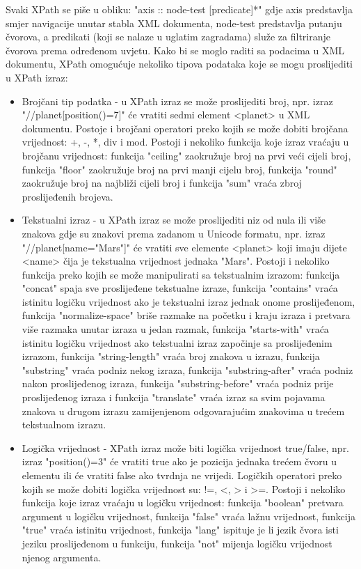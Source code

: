 \documentclass{foi}
\begin{document}
Svaki XPath se piše u obliku: "axis :: node-test [predicate]*" gdje axis predstavlja smjer navigacije unutar stabla XML dokumenta, node-test predstavlja putanju čvorova, a predikati (koji se nalaze u uglatim zagradama) služe za filtriranje čvorova prema određenom uvjetu. Kako bi se moglo raditi sa podacima u XML dokumentu, XPath omogućuje nekoliko tipova podataka koje se mogu proslijediti u XPath izraz:
\begin{itemize}
\item Brojčani tip podatka - u XPath izraz se može proslijediti broj, npr. izraz "//planet[position()=7]" će vratiti sedmi element <planet> u XML dokumentu. Postoje i brojčani operatori preko kojih se može dobiti brojčana vrijednost: +, -, *, div i mod. Postoji i nekoliko funkcija koje izraz vraćaju u brojčanu vrijednost: funkcija "ceiling" zaokružuje broj na prvi veći cijeli broj, funkcija "floor" zaokružuje broj na prvi manji cijelu broj, funkcija "round" zaokružuje broj na najbliži cijeli broj i funkcija "sum" vraća zbroj proslijeđenih brojeva.
\item Tekstualni izraz - u XPath izraz se može proslijediti niz od nula ili više znakova gdje su znakovi prema zadanom u Unicode formatu, npr. izraz "//planet[name="Mars"]" će vratiti sve elemente <planet> koji imaju dijete <name> čija je tekstualna vrijednost jednaka "Mars". Postoji i nekoliko funkcija preko kojih se može manipulirati sa tekstualnim izrazom: funkcija "concat" spaja sve proslijeđene tekstualne izraze, funkcija "contains" vraća istinitu logičku vrijednost ako je tekstualni izraz jednak onome proslijeđenom, funkcija "normalize-space" briše razmake na početku i kraju izraza i pretvara više razmaka unutar izraza u jedan razmak, funkcija "starts-with" vraća istinitu logičku vrijednost ako tekstualni izraz započinje sa proslijeđenim izrazom, funkcija "string-length" vraća broj znakova u izrazu, funkcija "substring" vraća podniz nekog izraza, funkcija "substring-after" vraća podniz nakon proslijeđenog izraza, funkcija "substring-before" vraća podniz prije proslijeđenog izraza i funkcija "translate" vraća izraz sa svim pojavama znakova u drugom izrazu zamijenjenom odgovarajućim znakovima u trećem tekstualnom izrazu.
\item Logička vrijednost - XPath izraz može biti logička vrijednost true/false, npr. izraz "position()=3" će vratiti true ako je pozicija jednaka trećem čvoru u elementu ili će vratiti false ako tvrdnja ne vrijedi.  Logičkih operatori preko kojih se može dobiti logička vrijednost su: !=, <, > i >=. Postoji i nekoliko funkcija koje izraz vraćaju u logičku vrijednost: funkcija "boolean" pretvara argument u logičku vrijednost, funkcija "false" vraća lažnu vrijednost, funkcija "true" vraća istinitu vrijednost, funkcija "lang" ispituje je li jezik čvora isti jeziku proslijeđenom u funkciju, funkcija "not" mijenja logičku vrijednost njenog argumenta.

\end{itemize}
\end{document}
